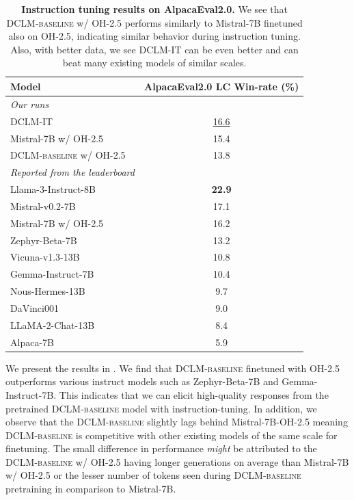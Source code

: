 \documentclass{article}
\newcommand{\hqpool}{\textsc{DCLM-baseline}\xspace}
\newcommand{\itpool}{\textsc{DCLM-IT}\xspace}
\newcommand{\oh}{\textsc{OH-2.5}\xspace}
\begin{document}
\begin{table}[t]
\centering
\caption{\textbf{Instruction tuning results on AlpacaEval2.0.} We see that \hqpool w/ \oh performs similarly to Mistral-7B finetuned also on \oh, indicating similar behavior during instruction tuning. Also, with better data, we see \itpool can be even better and can beat many existing models of similar scales. }
\label{tab:sft}
\begin{tabular}{lc}
\toprule
\textbf{Model} &       \textbf{AlpacaEval2.0 LC Win-rate (\%)} \\\midrule
\textit{Our runs}\\\midrule
  \itpool  &   \underline{16.6}        \\
 Mistral-7B w/ \oh &    15.4  \\
  \hqpool w/ \oh &    13.8 \\
  \midrule
  \textit{Reported from the leaderboard}\\\midrule
  Llama-3-Instruct-8B & \textbf{22.9 }\\
  Mistral-v0.2-7B & 17.1 \\
  Mistral-7B w/ \oh &    16.2  \\
  Zephyr-Beta-7B & 13.2 \\
  Vicuna-v1.3-13B & 10.8\\
  Gemma-Instruct-7B & 10.4\\
  Nous-Hermes-13B & 9.7 \\
  DaVinci001 & 9.0 \\
  LLaMA-2-Chat-13B & 8.4 \\
  Alpaca-7B & 5.9 \\ 
  \bottomrule
\end{tabular}
\vspace{-1em}
\end{table}

We present the results in . We find that \hqpool finetuned with \oh outperforms various instruct models such as Zephyr-Beta-7B and Gemma-Instruct-7B. This indicates that we can elicit high-quality responses from the pretrained \hqpool model with instruction-tuning. In addition, we observe that the \hqpool slightly lags behind Mistral-7B-\oh meaning \hqpool is competitive with other existing models of the same scale for finetuning. The small difference in performance \textit{might} be attributed to the \hqpool w/ \oh having longer generations on average than Mistral-7B w/ \oh or the lesser number of tokens seen during \hqpool pretraining in comparison to Mistral-7B.
\end{document}
